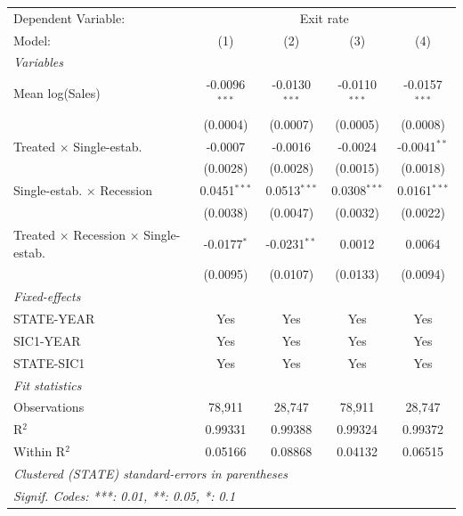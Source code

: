 \begingroup
\centering
\begin{tabular}{lcccc}
   \tabularnewline \midrule \midrule
   Dependent Variable: & \multicolumn{4}{c}{Exit rate}\\
   Model:                                              & (1)             & (2)             & (3)             & (4)\\  
   \midrule
   \emph{Variables}\\
   Mean log(Sales)                                     & -0.0096$^{***}$ & -0.0130$^{***}$ & -0.0110$^{***}$ & -0.0157$^{***}$\\   
                                                       & (0.0004)        & (0.0007)        & (0.0005)        & (0.0008)\\   
   Treated $\times$ Single-estab.                      & -0.0007         & -0.0016         & -0.0024         & -0.0041$^{**}$\\   
                                                       & (0.0028)        & (0.0028)        & (0.0015)        & (0.0018)\\   
   Single-estab. $\times$ Recession                    & 0.0451$^{***}$  & 0.0513$^{***}$  & 0.0308$^{***}$  & 0.0161$^{***}$\\   
                                                       & (0.0038)        & (0.0047)        & (0.0032)        & (0.0022)\\   
   Treated $\times$ Recession $\times$ Single-estab.   & -0.0177$^{*}$   & -0.0231$^{**}$  & 0.0012          & 0.0064\\   
                                                       & (0.0095)        & (0.0107)        & (0.0133)        & (0.0094)\\   
   \midrule
   \emph{Fixed-effects}\\
   STATE-YEAR                                          & Yes             & Yes             & Yes             & Yes\\  
   SIC1-YEAR                                           & Yes             & Yes             & Yes             & Yes\\  
   STATE-SIC1                                          & Yes             & Yes             & Yes             & Yes\\  
   \midrule
   \emph{Fit statistics}\\
   Observations                                        & 78,911          & 28,747          & 78,911          & 28,747\\  
   R$^2$                                               & 0.99331         & 0.99388         & 0.99324         & 0.99372\\  
   Within R$^2$                                        & 0.05166         & 0.08868         & 0.04132         & 0.06515\\  
   \midrule \midrule
   \multicolumn{5}{l}{\emph{Clustered (STATE) standard-errors in parentheses}}\\
   \multicolumn{5}{l}{\emph{Signif. Codes: ***: 0.01, **: 0.05, *: 0.1}}\\
\end{tabular}
\par\endgroup

